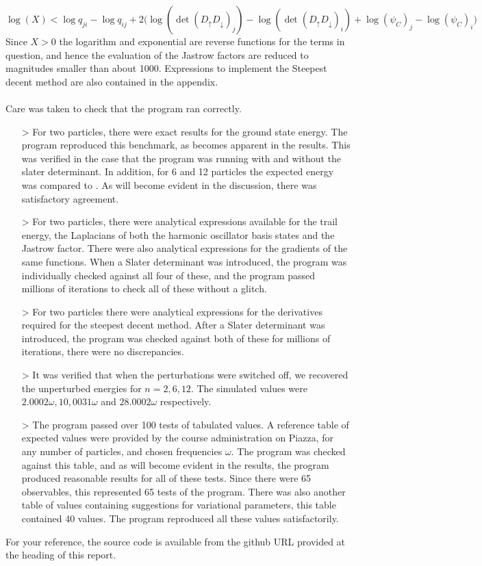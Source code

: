 \documentclass[11pt,english,a4paper]{article}
\begin{document}
\[
\log(X) < \log q_{ji} - \log q_{ij} + 2\big(\log( \det(D_\uparrow D_\downarrow)_j) - \log( \det(D_\uparrow D_\downarrow)_i) + \log (\psi_C)_j - \log (\psi_C)_i \big)
\]
Since $X > 0$ the logarithm and exponential are reverse functions for the terms in question, and hence the evaluation of the Jastrow factors are reduced to magnitudes smaller than about 1000. Expressions to implement the Steepest decent method are also contained in the appendix.\\
\\
Care was taken to check that the program ran correctly. 
\begin{itemize}
\item[>]For two particles, there were exact results for the ground state energy. The program reproduced this benchmark, as becomes apparent in the results. This was verified in the case that the program was running with and without the slater determinant. In addition, for 6 and 12 particles the expected energy was compared to \cite{m._pedersen_lohne_ab_2011}. As will become evident in the discussion, there was satisfactory agreement.
\item[>]For two particles, there were analytical expressions available for the trail energy, the Laplacians of both the harmonic oscillator basis states and the Jastrow factor. There were also analytical expressions for the gradients of the same functions. When a Slater determinant was introduced, the program was individually checked against all four of these, and the program passed millions of iterations to check all of these without a glitch.
\item[>]For two particles there were analytical expressions for the derivatives required for the steepest decent method. After a Slater determinant was introduced, the program was checked against both of these for millions of iterations, there were no discrepancies.
\item[>] It was verified that when the perturbations were switched off, we recovered the unperturbed energies for $n=2,6,12$. The simulated values were $2.0002\omega, 10,0031\omega$ and $28.0002\omega$ respectively.
\item[>]The program passed over 100 tests of tabulated values. A reference table of expected values were provided by the course administration on Piazza, for any number of particles, and chosen frequencies $\omega$. The program was checked against this table, and as will become evident in the results, the program produced reasonable results for all of these tests. Since there were 65 observables, this represented 65 tests of the program. There was also another table of values containing suggestions for variational parameters, this table contained 40 values. The program reproduced all these values satisfactorily.
\end{itemize}
For your reference, the source code is available from the github URL provided at the heading of this report.
\end{document}
